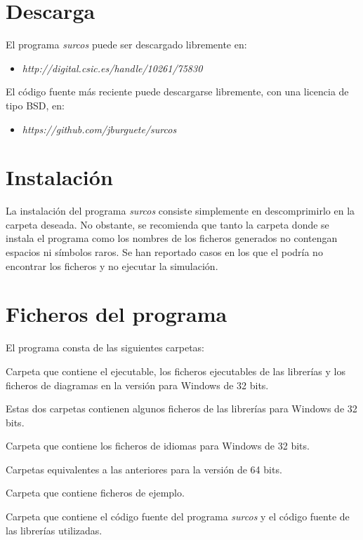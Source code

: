 \section{Descarga}

El programa \emph{surcos} puede ser descargado libremente en:
\begin{itemize}
\item \textit{http://digital.csic.es/handle/10261/75830}
\end{itemize}
El código fuente más reciente puede descargarse libremente, con una licencia de
tipo BSD, en:
\begin{itemize}
\item \textit{https://github.com/jburguete/surcos}
\end{itemize}

\section{Instalación}

La instalación del programa \emph{surcos} consiste simplemente en descomprimirlo
en la carpeta deseada. No obstante, se recomienda que tanto la carpeta donde se
instala el programa como los nombres de los ficheros generados no contengan
espacios ni símbolos raros. Se han reportado casos en los que el podría no
encontrar los ficheros y no ejecutar la simulación.

\section{Ficheros del programa}

El programa consta de las siguientes carpetas:
\begin{description}
\item[win32/bin]
\item Carpeta que contiene el ejecutable, los ficheros ejecutables de las
librerías y los ficheros de diagramas en la versión para Windows de 32 bits.
\item[win32/etc]
\item[win32/lib]
\item Estas dos carpetas contienen algunos ficheros de las librerías para
Windows de 32 bits.
\item[win32/share]
\item Carpeta que contiene los ficheros de idiomas para Windows de 32 bits.
\item[win64/bin]
\item[win64/etc]
\item[win64/lib]
\item[win64/share]
\item Carpetas equivalentes a las anteriores para la versión de 64 bits.
\item[examples]
\item Carpeta que contiene ficheros de ejemplo.
\item[src]
\item Carpeta que contiene el código fuente del programa \emph{surcos} y el
código fuente de las librerías utilizadas.
\end{description}

